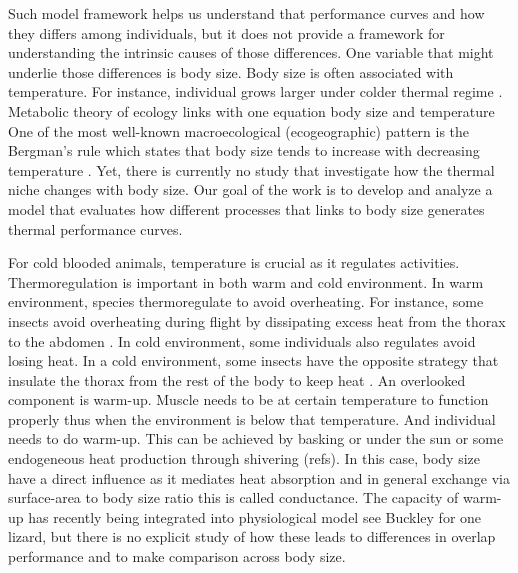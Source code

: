 Such model framework helps us understand that performance curves and how they differs  among individuals, but it does not provide a framework for understanding the intrinsic causes of those differences.
One variable that might underlie those differences is body size.
Body size is often associated with temperature.  
For instance, individual grows larger under colder thermal regime \citep{Van1996}.
Metabolic theory of ecology links with one equation body size and temperature \citep{Brown2004}
One of the most well-known macroecological (ecogeographic) pattern is the Bergman's rule which states that body size tends to increase with decreasing temperature \citep{Bergman1847}. 
Yet, there is currently no study that investigate how the thermal niche changes with body size.
Our goal of the work is to develop and analyze a model that evaluates how different processes that links to body size generates thermal performance curves.

For cold blooded animals, temperature is crucial as it regulates activities.
Thermoregulation is important in both warm and cold environment.
In warm environment, species thermoregulate to avoid overheating.
For instance, some insects avoid overheating during flight by dissipating excess heat from the thorax to the abdomen \citep{Verdu2012}.
In cold environment, some individuals also regulates avoid losing heat.
In a cold environment, some insects have the opposite strategy that insulate the thorax from the rest of the body to keep heat \citep{Verdu2012}.
An overlooked component is warm-up.
Muscle needs to be at certain temperature to function properly thus when the environment is below that temperature.
And individual needs to do warm-up. 
This can be achieved by basking or under the sun or some endogeneous heat production through shivering (refs).
In this case, body size have a direct influence as it mediates heat absorption and in general exchange via surface-area to body size ratio this is called conductance.
The capacity of warm-up has recently being integrated into physiological model see Buckley for one lizard,  but there is no explicit study of how these leads to differences in overlap performance and to make comparison across body size. 

